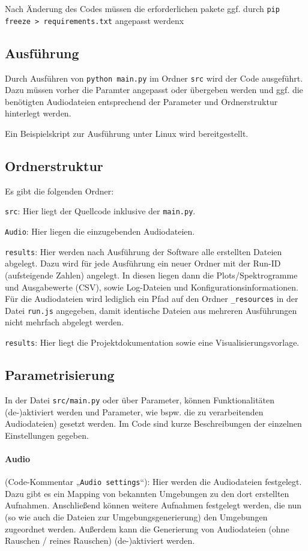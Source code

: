 \documentclass[
	fontsize=10.5pt,
	marginpar=false,
	ngerman,
	accentcolor=3d
	]{tudapub}
\begin{document}
Nach Änderung des Codes müssen die erforderlichen pakete ggf. durch \texttt{pip freeze > requirements.txt} angepasst werdenx

\subsection{Ausführung}

Durch Ausführen von \texttt{python main.py} im Ordner \texttt{src} wird der Code ausgeführt. Dazu müssen vorher die Paramter angepasst oder übergeben werden und ggf. die benötigten Audiodateien entsprechend der Parameter und Ordnerstruktur hinterlegt werden.

Ein Beispielskript zur Ausführung unter Linux wird bereitgestellt.

\subsection{Ordnerstruktur}

Es gibt die folgenden Ordner:

\texttt{src}: Hier liegt der Quellcode inklusive der \texttt{main.py}.

\texttt{Audio}: Hier liegen die einzugebenden Audiodateien.

\texttt{results}: Hier werden nach Ausführung der Software alle erstellten Dateien abgelegt. Dazu wird für jede Ausführung ein neuer Ordner mit der Run-ID (aufsteigende Zahlen) angelegt. In diesen liegen dann die Plots/Spektrogramme und Ausgabewerte (CSV), sowie Log-Dateien und Konfigurationsinformationen. Für die Audiodateien wird lediglich ein Pfad auf den Ordner \texttt{\_resources} in der Datei \texttt{run.js} angegeben, damit identische Dateien aus mehreren Ausführungen nicht mehrfach abgelegt werden.

\texttt{results}: Hier liegt die Projektdokumentation sowie eine Visualisierungsvorlage.

\subsection{Parametrisierung}
In der Datei \texttt{src/main.py} oder über Parameter, können Funktionalitäten (de-)aktiviert werden und Parameter, wie bspw. die zu verarbeitenden Audiodateien) gesetzt werden. Im Code sind kurze Beschreibungen der einzelnen Einstellungen gegeben.

\paragraph{Audio} (Code-Kommentar „\texttt{Audio settings}“): Hier werden die Audiodateien festgelegt. Dazu gibt es ein Mapping von bekannten Umgebungen zu den dort erstellten Aufnahmen. Anschließend können weitere Aufnahmen festgelegt werden, die nun (so wie auch die Dateien zur Umgebungsgenerierung) den Umgebungen zugeordnet werden. Außerdem kann die Generierung von Audiodateien (ohne Rauschen / reines Rauschen) (de-)aktiviert werden.
\end{document}
